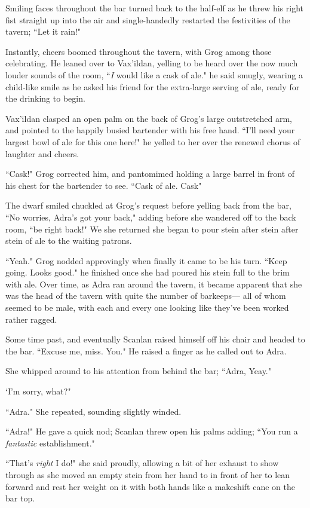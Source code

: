 Smiling faces throughout the bar turned back to the half-elf as he threw his right fist straight up into the air and single-handedly restarted the festivities of the tavern; ``Let it rain!"

Instantly, cheers boomed throughout the tavern, with Grog among those celebrating. He leaned over to Vax'ildan, yelling to be heard over the now much louder sounds of the room, ``\textit{I} would like a cask of ale." he said smugly, wearing a child-like smile as he asked his friend for the extra-large serving of ale, ready for the drinking to begin. 

Vax'ildan clasped an open palm on the back of Grog's large outstretched arm, and pointed to the happily busied bartender with his free hand. ``I'll need your largest bowl of ale for this one here!" he yelled to her over the renewed chorus of laughter and cheers.

``Cask!" Grog corrected him, and pantomimed holding a large barrel in front of his chest for the bartender to see. ``Cask of ale. Cask"

The dwarf smiled chuckled at Grog's request before yelling back from the bar, ``No worries, Adra's got your back," adding before she wandered off to the back room, ``be right back!" We she returned she began to pour stein after stein after stein of ale to the waiting patrons. 

``Yeah." Grog nodded approvingly when finally it came to be his turn. ``Keep going. Looks good." he finished once she had poured his stein full to the brim with ale. Over time, as Adra ran around the tavern, it became apparent that she was the head of the tavern with quite the number of barkeeps--- all of whom seemed to be male, with each and every one looking like they've been worked rather ragged.

Some time past, and eventually Scanlan raised himself off his chair and headed to the bar. ``Excuse me, miss. You." He raised a finger as he called out to Adra.

She whipped around to his attention from behind the bar; ``Adra, Yeay."

`I'm sorry, what?"

``Adra." She repeated, sounding slightly winded.

``Adra!" He gave a quick nod; Scanlan threw open his palms adding; ``You run a \textit{fantastic} establishment." 

``That's \textit{right} I do!" she said proudly, allowing a bit of her exhaust to show through as she moved an empty stein from her hand to in front of her to lean forward and rest her weight on it with both hands like a makeshift cane on the bar top. 


